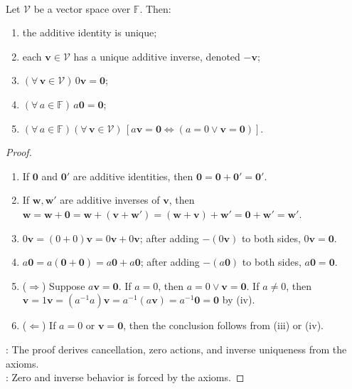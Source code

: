 \begin{theorem} \label{thm:basicvectorspaceconsequences} \\
\leanok Let $\mathcal{V}$ be a vector space over $\mathbb{F}$. Then:
\begin{enumerate}[label=(\roman*)]
\setlength{\itemsep}{0pt}
\item the additive identity is unique;
\item each $\mathbf{v}\in\mathcal{V}$ has a unique additive inverse, denoted $-\mathbf{v}$;
\item $(\forall\,\mathbf{v}\in\mathcal{V})\,0\mathbf{v}=\mathbf{0}$;
\item $(\forall\,a\in\mathbb{F})\,a\mathbf{0}=\mathbf{0}$;
\item $(\forall\,a\in\mathbb{F})(\forall\,\mathbf{v}\in\mathcal{V})\,[a\mathbf{v}=\mathbf{0}\iff(a=0\lor\mathbf{v}=\mathbf{0})]$.
\end{enumerate}
\begin{proof}
\leanok
\begin{enumerate}[label=(\roman*)]
\setlength{\itemsep}{0pt}
\item[$(i)$] If $\mathbf{0}$ and $\mathbf{0}'$ are additive identities, then $\mathbf{0}=\mathbf{0}+\mathbf{0}'=\mathbf{0}'$.
\item[$(ii)$] If $\mathbf{w},\mathbf{w}'$ are additive inverses of $\mathbf{v}$, then $\mathbf{w}=\mathbf{w}+\mathbf{0}=\mathbf{w}+(\mathbf{v}+\mathbf{w}') =(\mathbf{w}+\mathbf{v})+\mathbf{w}'=\mathbf{0}+\mathbf{w}'=\mathbf{w}'$.
\item[$(iii)$] $0\mathbf{v}=(0+0)\mathbf{v}=0\mathbf{v}+0\mathbf{v}$; after adding $-(0\mathbf{v})$ to both sides, $0\mathbf{v}=\mathbf{0}$.
\item[$(iv)$] $a\mathbf{0}=a(\mathbf{0}+\mathbf{0})=a\mathbf{0}+a\mathbf{0}$; after adding $-(a\mathbf{0})$ to both sides, $a\mathbf{0}=\mathbf{0}$.
\item[$(v)$] ($\Rightarrow$) Suppose $a\mathbf{v}=\mathbf{0}$. If $a=0$, then $a=0\lor\mathbf{v}=\mathbf{0}$. If $a\neq0$, then $\mathbf{v}=1\mathbf{v}=(a^{-1}a)\mathbf{v}=a^{-1}(a\mathbf{v})=a^{-1}\mathbf{0}=\mathbf{0}$ by (iv).
\item[$(v)$] ($\Leftarrow$) If $a=0$ or $\mathbf{v}=\mathbf{0}$, then the conclusion follows from (iii) or (iv).
\end{enumerate}
: The proof derives cancellation, zero actions, and inverse uniqueness from the axioms.\\
: Zero and inverse behavior is forced by the axioms.
\end{proof}
\end{theorem}

